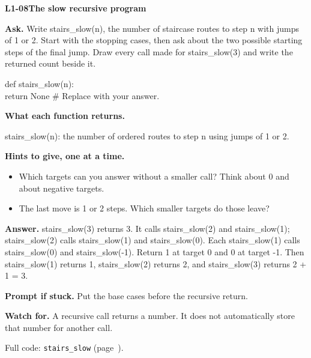 \documentclass[11pt,a4paper]{article}
\begin{document}
\noindent\begin{minipage}{\textwidth}
{\color{teal}\textbf{L1-08}}\quad \textbf{The slow recursive program}\par\smallskip
\textbf{Ask.} Write stairs\_slow(n), the number of staircase routes to step n with jumps of 1 or 2. Start with the stopping cases, then ask about the two possible starting steps of the final jump. Draw every call made for stairs\_slow(3) and write the returned count beside it.\par\smallskip
\par{}\par\smallskip\noindent\colorbox{codepaper}{\parbox{\dimexpr\linewidth-2\fboxsep\relax}{\small\ttfamily\raggedright def stairs\_slow(n):\\\hspace*{2.4em}return None  \# Replace with your answer.}}\par
{\small\textbf{What each function returns.}\par stairs\_slow(n): the number of ordered routes to step n using jumps of 1 or 2.\par }
{\small\textbf{Hints to give, one at a time.}}\begin{itemize}\item Which targets can you answer without a smaller call? Think about 0 and about negative targets.\item The last move is 1 or 2 steps. Which smaller targets do those leave?\end{itemize}
\textbf{Answer.} stairs\_slow(3) returns 3. It calls stairs\_slow(2) and stairs\_slow(1); stairs\_slow(2) calls stairs\_slow(1) and stairs\_slow(0). Each stairs\_slow(1) calls stairs\_slow(0) and stairs\_slow(-1). Return 1 at target 0 and 0 at target -1. Then stairs\_slow(1) returns 1, stairs\_slow(2) returns 2, and stairs\_slow(3) returns 2 + 1 = 3.\par\smallskip
\textbf{Prompt if stuck.} Put the base cases before the recursive return.\par\smallskip
\textbf{Watch for.} A recursive call returns a number. It does not automatically store that number for another call.\par\smallskip Full code: \texttt{stairs\_slow} (page~\pageref{L1-code-stairs_slow}).
\end{minipage}\par{}\medskip
\end{document}

